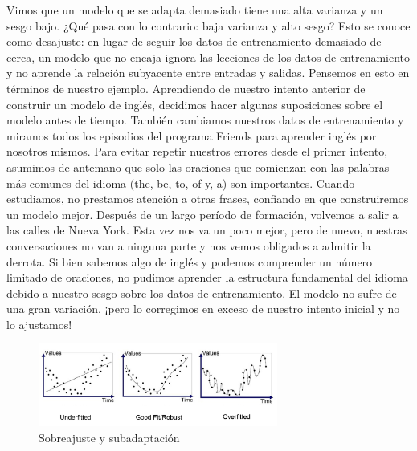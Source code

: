 Vimos que un modelo que se adapta demasiado tiene una alta varianza y un sesgo bajo. ¿Qué pasa con lo contrario: baja varianza y alto sesgo? Esto se conoce como desajuste: en lugar de seguir los datos de entrenamiento demasiado de cerca, un modelo que no encaja ignora las lecciones de los datos de entrenamiento y no aprende la relación subyacente entre entradas y salidas.
Pensemos en esto en términos de nuestro ejemplo. Aprendiendo de nuestro intento anterior de construir un modelo de inglés, decidimos hacer algunas suposiciones sobre el modelo antes de tiempo. También cambiamos nuestros datos de entrenamiento y miramos todos los episodios del programa Friends para aprender inglés por nosotros mismos. Para evitar repetir nuestros errores desde el primer intento, asumimos de antemano que solo las oraciones que comienzan con las palabras más comunes del idioma (the, be, to, of y, a) son importantes. Cuando estudiamos, no prestamos atención a otras frases, confiando en que construiremos un modelo mejor.
Después de un largo período de formación, volvemos a salir a las calles de Nueva York. Esta vez nos va un poco mejor, pero de nuevo, nuestras conversaciones no van a ninguna parte y nos vemos obligados a admitir la derrota. Si bien sabemos algo de inglés y podemos comprender un número limitado de oraciones, no pudimos aprender la estructura fundamental del idioma debido a nuestro sesgo sobre los datos de entrenamiento. El modelo no sufre de una gran variación, ¡pero lo corregimos en exceso de nuestro intento inicial y no lo ajustamos!

\begin{figure}[htb]
\centering
\includegraphics[width=0.7\textwidth]{capitulo1/sobreajuste.png}
\caption{Sobreajuste y subadaptación}
\label{cap1:002}
\end{figure} 


